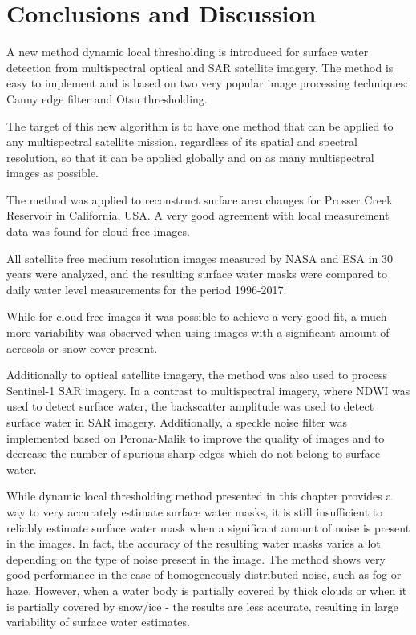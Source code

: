 \section{Conclusions and Discussion}

A new method dynamic local thresholding is introduced for surface water detection from multispectral optical and SAR satellite imagery. The method is easy to implement and is based on two very popular image processing techniques: Canny edge filter and Otsu thresholding.

The target of this new algorithm is to have one method that can be applied to any multispectral satellite mission, regardless of its spatial and spectral resolution, so that it can be applied globally and on as many multispectral images as possible.

The method was applied to reconstruct surface area changes for Prosser Creek Reservoir in California, USA. A very good agreement with local measurement data was found for cloud-free images.

All satellite free medium resolution images measured by NASA and ESA in 30 years were analyzed, and the resulting surface water masks were compared to daily water level measurements for the period 1996-2017.

While for cloud-free images it was possible to achieve a very good fit, a much more variability was observed when using images with a significant amount of aerosols or snow cover present.

Additionally to optical satellite imagery, the method was also used to process Sentinel-1 SAR imagery. In a contrast to multispectral imagery, where NDWI was used to detect surface water, the backscatter amplitude was used to detect surface water in SAR imagery. Additionally, a speckle noise filter was implemented based on Perona-Malik to improve the quality of images and to decrease the number of spurious sharp edges which do not belong to surface water.

While dynamic local thresholding method presented in this chapter provides a way to very accurately estimate surface water masks, it is still insufficient to reliably estimate surface water mask when a significant amount of noise is present in the images. In fact, the accuracy of the resulting water masks varies a lot depending on the type of noise present in the image. The method shows very good performance in the case of homogeneously distributed noise, such as fog or haze. However, when a water body is partially covered by thick clouds or when it is partially covered by snow/ice - the results are less accurate, resulting in large variability of surface water estimates.

